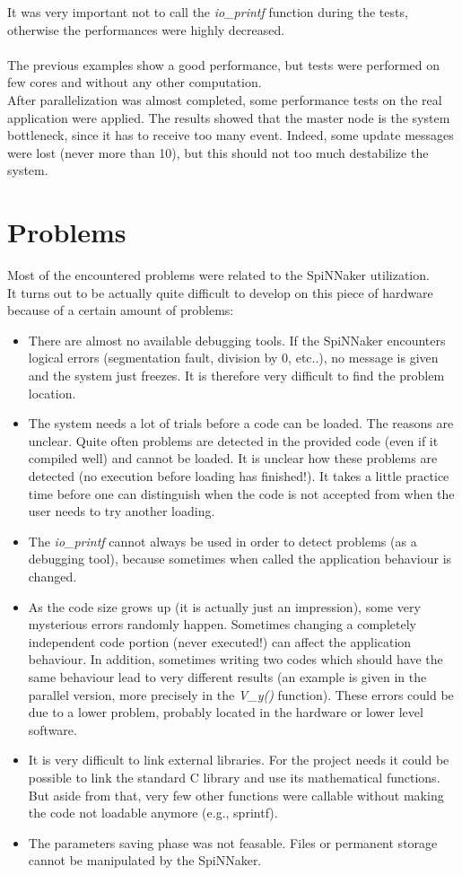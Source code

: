 \documentclass{article}
\begin{document}
It was very important not to call the \textit{io\_printf} function during the tests, otherwise the performances were highly decreased.\\ \\

The previous examples show a good performance, but tests were performed on few cores and without any other computation. \\
After parallelization was almost completed, some performance tests on the real application were applied. The results showed that the master node is the system bottleneck, since it has to receive too many event. Indeed, some update messages were lost (never more than 10), but this should not too much destabilize the system.


\section{Problems}
Most of the encountered problems were related to the SpiNNaker utilization. \\
It turns out to be actually quite difficult to develop on this piece of hardware because of a certain amount of problems:
\begin{itemize}
\item There are almost no available debugging tools. If the SpiNNaker encounters logical errors (segmentation fault, division by 0, etc..), no message is given and the system just freezes. It is therefore very difficult to find the problem location.
\item The system needs a lot of trials before a code can be loaded. The reasons are unclear. Quite often problems are detected in the provided code (even if it compiled well) and cannot be loaded. It is unclear how these problems are detected (no execution before loading has finished!). It takes a little practice time before one can distinguish when the code is not accepted from when the user needs to try another loading.
\item The \textit{io\_printf} cannot always be used in order to detect problems (as a debugging tool), because sometimes when called the application behaviour is changed.
\item As the code size grows up (it is actually just an impression), some very mysterious errors randomly happen. Sometimes changing a completely independent code portion (never executed!) can affect the application behaviour. In addition, sometimes writing two codes which should have the same behaviour lead to very different results (an example is given in the parallel version, more precisely in the \textit{V\_y()} function). These errors could be due to a lower problem, probably located in the hardware or lower level software. 
\item It is very difficult to link external libraries. For the project needs it could be possible to link the standard C library and use its mathematical functions. But aside from that, very few other functions were callable without making the code not loadable anymore (e.g., sprintf).
\item The parameters saving phase was not feasable. Files or permanent storage cannot be manipulated by the SpiNNaker.
\end{itemize}
\end{document}
